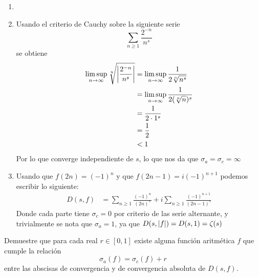 \begin{sol}
    \begin{enumerate}[label = (\roman*)]
        \item 

        \item Usando el criterio de Cauchy sobre la siguiente serie
        \[\sum_{n\geq 1}\frac{2^{-n}}{n^s}\]
        se obtiene
        \begin{align*}
            \limsup_{n\rightarrow\infty}\sqrt[n]{\left|\frac{2^{-n}}{n^s}\right|}&=\limsup_{n\rightarrow\infty}\frac{1}{2\sqrt[n]{n^s}}\\
            &=\limsup_{n\rightarrow\infty}\frac{1}{2(\sqrt[n]{n})^s}\\
            &=\frac{1}{2\cdot1^s}\\
            &=\frac{1}{2}\\
            &<1
        \end{align*}
        Por lo que converge independiente de $s$, lo que nos da que $\sigma_a=\sigma_c=\infty$

        \item Usando que $f(2n)=(-1)^n$ y que $f(2n-1)=i(-1)^{n+1}$ podemos escribir lo siguiente:
        \begin{align*}
            D(s,f)&=\sum_{n\geq1}\frac{(-1)^n}{(2n)^s}+i\sum_{n\geq1}\frac{(-1)^{n+1}}{(2n-1)^s}
        \end{align*}
        Donde cada parte tiene $\sigma_c=0$ por criterio de las serie alternante, y trivialmente se nota que $\sigma_a=1$, ya que $D(s,\left|f\right|)=D(s,1)=\zeta(s)$
    \end{enumerate}
\end{sol}

\begin{prob}[3 pts.]
    Demuestre que para cada real $r\in[0,1]$ existe alguna función aritmética $f$ que cumple la relación
    \[\sigma_a(f)=\sigma_c(f)+r\]
    entre las abscisas de convergencia y de convergencia absoluta de $D(s,f)$.
\end{prob}


